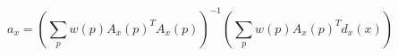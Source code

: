 \begin{equation}
    \label{eq:optimal-parameter-affine-weighted-halved}
    a_x = \left (\sum_p w(p) A_x(p)^T A_x(p) \right )^{-1} \left (\sum_p w(p) A_x(p)^T d_x(x) \right)
\end{equation}